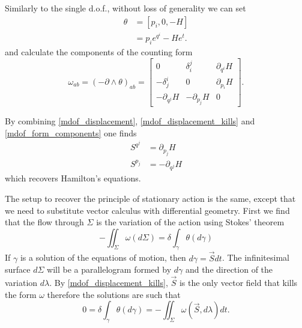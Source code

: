 \documentclass[fleqn,10pt]{wlscirep}
\begin{document}
Similarly to the single d.o.f., without loss of generality we can set
\begin{equation}\label{mdof_potential_expression}
\begin{aligned}
	\theta &= [p_i, 0, -H] \\
	&= p_i e^{q^i} - H e^t.
\end{aligned}
\end{equation}
and calculate the components of the counting form
\begin{equation}\label{mdof_form_components}
	\omega_{ab} = (-\partial\wedge\theta)_{ab} = \begin{bmatrix}
		0 & \delta^j_i & \partial_{q^i} H \\
		-\delta^i_j & 0 & \partial_{p_i} H \\
		-\partial_{q^j} H & -\partial_{p_j} H & 0
	\end{bmatrix}.
\end{equation}

By combining \ref{mdof_displacement}, \ref{mdof_displacement_kills} and \ref{mdof_form_components} one finds
\begin{equation}\label{mdof_Ham_eq}
\begin{aligned}
	S^{q^j} &= \partial_{p_j} H \\
	S^{p_j} &= - \partial_{q^j} H
\end{aligned}
\end{equation}
which recovers Hamilton's equations.

The setup to recover the principle of stationary action is the same, except that we need to substitute vector calculus with differential geometry. First we find that the flow through $\Sigma$ is the variation of the action using Stokes' theorem
\begin{equation}\label{mdof_action}
	- \iint_{\Sigma} \omega(d\Sigma) = \delta \int_{\gamma} \theta(d\gamma) 
\end{equation}
If $\gamma$ is a solution of the equations of motion, then $d\gamma = \vec{S} dt$. The infinitesimal surface $d\Sigma$ will be a parallelogram formed by $d\gamma$ and the direction of the variation $d\lambda$. By \ref{mdof_displacement_kills}, $\vec{S}$ is the only vector field that kills the form $\omega$ therefore the solutions are such that
\begin{equation}\label{mdof_stationary_action}
		0 = \delta \int_{\gamma} \theta(d\gamma) = - \iint_{\Sigma} \omega(\vec{S}, d\lambda) dt. 
\end{equation}
\end{document}
